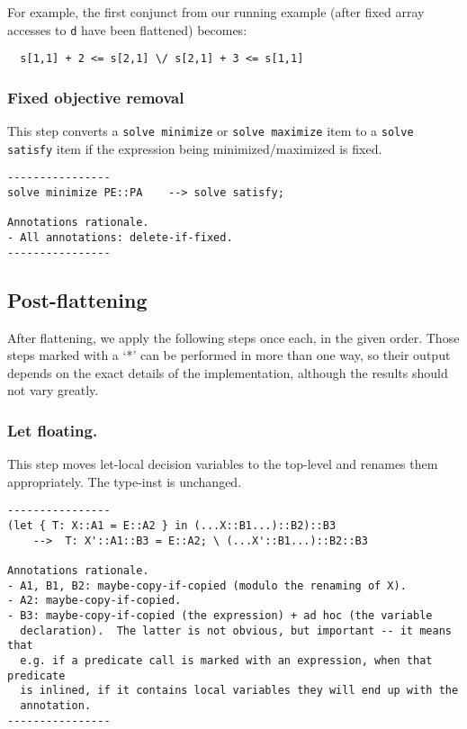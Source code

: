\documentclass[10pt]{article}
\begin{document}
For example, the first conjunct from our running example (after fixed array
accesses to \texttt{d} have been flattened) becomes:
\begin{verbatim}
  s[1,1] + 2 <= s[2,1] \/ s[2,1] + 3 <= s[1,1]
\end{verbatim}

\subsubsection{Fixed objective removal}
This step converts a \texttt{solve minimize} or \texttt{solve maximize} item
to a \texttt{solve satisfy} item if the expression being minimized/maximized
is fixed.

\begin{verbatim}
----------------
solve minimize PE::PA    --> solve satisfy;

Annotations rationale.
- All annotations: delete-if-fixed.
----------------
\end{verbatim}

\subsection{Post-flattening}
After flattening, we apply the following steps once each, in the given order.
Those steps marked with a `*' can be performed in more than one way, so
their output depends on the exact details of the implementation, although
the results should not vary greatly.


\subsubsection{Let floating.}
This step moves let-local decision variables to the top-level and renames them
appropriately.  The type-inst is unchanged.

\begin{verbatim}
----------------
(let { T: X::A1 = E::A2 } in (...X::B1...)::B2)::B3
    -->  T: X'::A1::B3 = E::A2; \ (...X'::B1...)::B2::B3

Annotations rationale.
- A1, B1, B2: maybe-copy-if-copied (modulo the renaming of X).
- A2: maybe-copy-if-copied.
- B3: maybe-copy-if-copied (the expression) + ad hoc (the variable
  declaration).  The latter is not obvious, but important -- it means that
  e.g. if a predicate call is marked with an expression, when that predicate
  is inlined, if it contains local variables they will end up with the
  annotation.
----------------
\end{verbatim}
\end{document}
